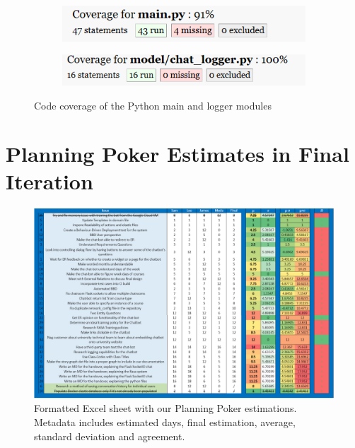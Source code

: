 \documentclass{l3proj}
\begin{document}
\begin{figure}[h]
  \centering
  \begin{subfigure}[b]{0.425\linewidth}
    \includegraphics[width=\linewidth]{figures/Unit_Testing_2.PNG}
  \end{subfigure}
  \begin{subfigure}[b]{0.425\linewidth}
    \includegraphics[width=\linewidth]{figures/Unit_Testing_3.PNG}
  \end{subfigure}
  \caption{Code coverage of the Python main and logger modules}
\end{figure}

\section{Planning Poker Estimates in Final Iteration}
\label{apdx:pp}

\begin{figure}[h!]
    \centering
    \includegraphics[width=0.85\linewidth]{figures/ppiteration6.PNG}
    \caption{Formatted Excel sheet with our Planning Poker estimations. Metadata includes estimated days, final estimation, average, standard deviation and agreement.}
\end{figure}
\end{document}
